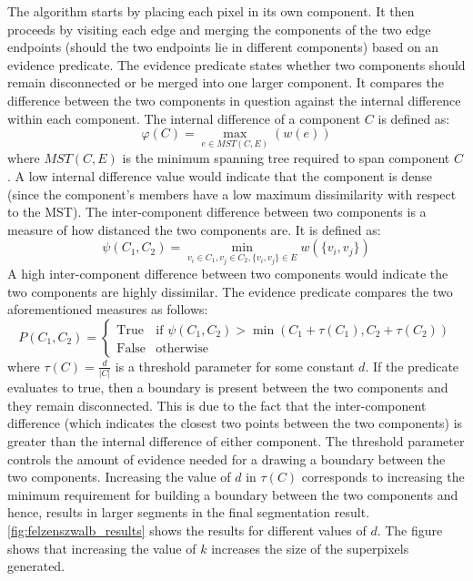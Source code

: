 The algorithm starts by placing each pixel in its own component. It then proceeds by visiting each edge and merging the components of the two edge endpoints (should the two endpoints lie in different components) based on an evidence predicate. The evidence predicate states whether two components should remain disconnected or be merged into one larger component. It compares the difference between the two components in question against the internal difference within each component. The internal difference of a component $C$ is defined as:
\begin{equation}
    \varphi(C) = \max_{e \in MST(C,E)}(w(e))
\end{equation}
where $MST(C,E)$ is the minimum spanning tree required to span component $C$. A low internal difference value would indicate that the component is dense (since the component's members have a low maximum dissimilarity with respect to the MST).
The inter-component difference between two components is a measure of how distanced the two components are. It is defined as:
\begin{equation}
    \psi(C_1, C_2) = \min_{v_i \in C_1, v_j \in C_2, \{v_i, v_j\} \in E}w(\{v_i, v_j\})
\end{equation}
A high inter-component difference between two components would indicate the two components are highly dissimilar. The evidence predicate compares the two aforementioned measures as follows:
\begin{equation}
    P(C_1, C_2) = 
    \left\{
	\begin{array}{ll}
		\mbox{True}  & \mbox{if } \psi(C_1, C_2) > \min(C_1 + \tau(C_1), C_2 + \tau(C_2))\\
		\mbox{False} & \mbox{otherwise}
	\end{array}
\right.
\end{equation}
where $\tau(C) = \frac{d}{|C|}$ is a threshold parameter for some constant $d$.
If the predicate evaluates to true, then a boundary is present between the two components and they remain disconnected. This is due to the fact that the inter-component difference (which indicates the closest two points between the two components) is greater than the internal difference of either component. The threshold parameter controls the amount of evidence needed for a drawing a boundary between the two components. Increasing the value of $d$ in $\tau(C)$ corresponds to increasing the minimum requirement for building a boundary between the two components and hence, results in larger segments in the final segmentation result.
\autoref{fig:felzenszwalb_results} shows the results for different values of $d$. The figure shows that increasing the value of $k$ increases the size of the superpixels generated.

